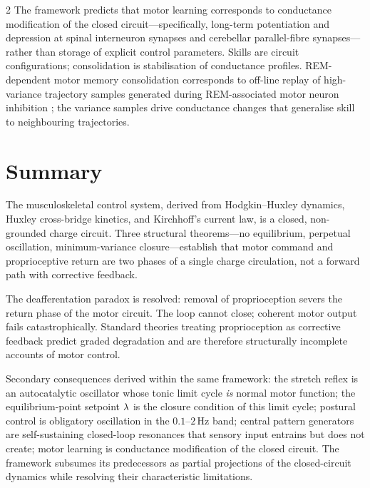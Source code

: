 \begin{multicols}{2}
The framework predicts that motor learning corresponds to conductance
modification of the closed circuit---specifically, long-term potentiation and
depression at spinal interneuron synapses and cerebellar parallel-fibre
synapses---rather than storage of explicit control parameters.  Skills are
circuit configurations; consolidation is stabilisation of conductance profiles.
REM-dependent motor memory consolidation \citep{shadmehr2008} corresponds to
off-line replay of high-variance trajectory samples generated during
REM-associated motor neuron inhibition \citep{grillner1985}; the variance
samples drive conductance changes that generalise skill to neighbouring
trajectories.

\end{multicols}

\section*{Summary}

The musculoskeletal control system, derived from Hodgkin--Huxley dynamics,
Huxley cross-bridge kinetics, and Kirchhoff's current law, is a closed,
non-grounded charge circuit.  Three structural theorems---no equilibrium,
perpetual oscillation, minimum-variance closure---establish that motor command
and proprioceptive return are two phases of a single charge circulation, not
a forward path with corrective feedback.

The deafferentation paradox is resolved: removal of proprioception severs the
return phase of the motor circuit.  The loop cannot close; coherent motor
output fails catastrophically.  Standard theories treating proprioception as
corrective feedback predict graded degradation and are therefore structurally
incomplete accounts of motor control.

Secondary consequences derived within the same framework: the stretch reflex
is an autocatalytic oscillator whose tonic limit cycle \emph{is} normal motor
function; the equilibrium-point setpoint $\lambda$ is the closure condition
of this limit cycle; postural control is obligatory oscillation in the
$0.1$--$2$\,Hz band; central pattern generators are self-sustaining
closed-loop resonances that sensory input entrains but does not create; motor
learning is conductance modification of the closed circuit.  The framework
subsumes its predecessors as partial projections of the closed-circuit
dynamics while resolving their characteristic limitations.
